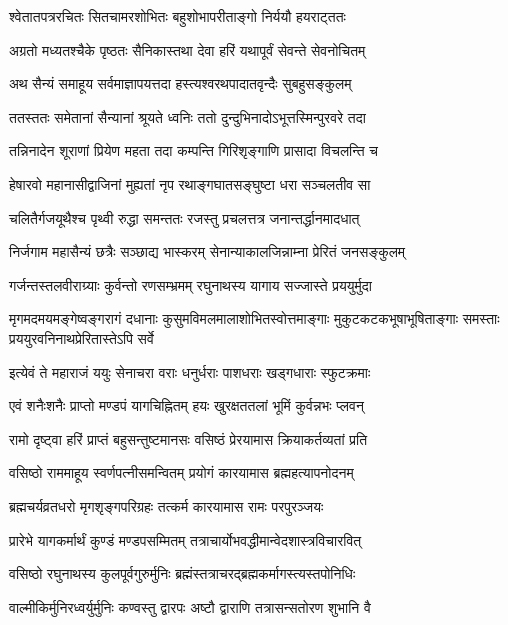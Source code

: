 \twolineshloka
{श्वेतातपत्ररचितः सितचामरशोभितः}
{बहुशोभापरीताङ्गो निर्ययौ हयराट्ततः}%

\twolineshloka
{अग्रतो मध्यतश्चैके पृष्ठतः सैनिकास्तथा}
{देवा हरिं यथापूर्वं सेवन्ते सेवनोचितम्}%

\twolineshloka
{अथ सैन्यं समाहूय सर्वमाज्ञापयत्तदा}
{हस्त्यश्वरथपादातवृन्दैः सुबहुसङ्कुलम्}%

\twolineshloka
{ततस्ततः समेतानां सैन्यानां श्रूयते ध्वनिः}
{ततो दुन्दुभिनादोऽभूत्तस्मिन्पुरवरे तदा}%

\twolineshloka
{तन्निनादेन शूराणां प्रियेण महता तदा}
{कम्पन्ति गिरिशृङ्गाणि प्रासादा विचलन्ति च}%

\twolineshloka
{हेषारवो महानासीद्वाजिनां मुह्यतां नृप}
{रथाङ्गघातसङ्घुष्टा धरा सञ्चलतीव सा}%

\twolineshloka
{चलितैर्गजयूथैश्च पृथ्वी रुद्धा समन्ततः}
{रजस्तु प्रचलत्तत्र जनान्तर्द्धानमादधात्}%

\twolineshloka
{निर्जगाम महासैन्यं छत्रैः सञ्छाद्य भास्करम्}
{सेनान्याकालजिन्नाम्ना प्रेरितं जनसङ्कुलम्}%

\twolineshloka
{गर्जन्तस्तलवीराग्र्याः कुर्वन्तो रणसम्भ्रमम्}
{रघुनाथस्य यागाय सज्जास्ते प्रययुर्मुदा}%

\twolineshloka
{मृगमदमयमङ्गेष्वङ्गरागं दधानाः कुसुमविमलमालाशोभितस्वोत्तमाङ्गाः}
{मुकुटकटकभूषाभूषिताङ्गाः समस्ताः प्रययुरवनिनाथप्रेरितास्तेऽपि सर्वे}%

\twolineshloka
{इत्येवं ते महाराजं ययुः सेनाचरा वराः}
{धनुर्धराः पाशधराः खड्गधाराः स्फुटक्रमाः}%

\twolineshloka
{एवं शनैःशनैः प्राप्तो मण्डपं यागचिह्नितम्}
{हयः खुरक्षततलां भूमिं कुर्वन्नभः प्लवन्}%

\twolineshloka
{रामो दृष्ट्वा हरिं प्राप्तं बहुसन्तुष्टमानसः}
{वसिष्ठं प्रेरयामास क्रियाकर्तव्यतां प्रति}%

\twolineshloka
{वसिष्ठो राममाहूय स्वर्णपत्नीसमन्वितम्}
{प्रयोगं कारयामास ब्रह्महत्यापनोदनम्}%

\twolineshloka
{ब्रह्मचर्यव्रतधरो मृगशृङ्गपरिग्रहः}
{तत्कर्म कारयामास रामः परपुरञ्जयः}%

\twolineshloka
{प्रारेभे यागकर्मार्थं कुण्डं मण्डपसम्मितम्}
{तत्राचार्योभवद्धीमान्वेदशास्त्रविचारवित्}%

\twolineshloka
{वसिष्ठो रघुनाथस्य कुलपूर्वगुरुर्मुनिः}
{ब्रह्मंस्तत्राचरद्ब्रह्मकर्मागस्त्यस्तपोनिधिः}%

\twolineshloka
{वाल्मीकिर्मुनिरध्वर्युर्मुनिः कण्वस्तु द्वारपः}
{अष्टौ द्वाराणि तत्रासन्सतोरण शुभानि वै}%

